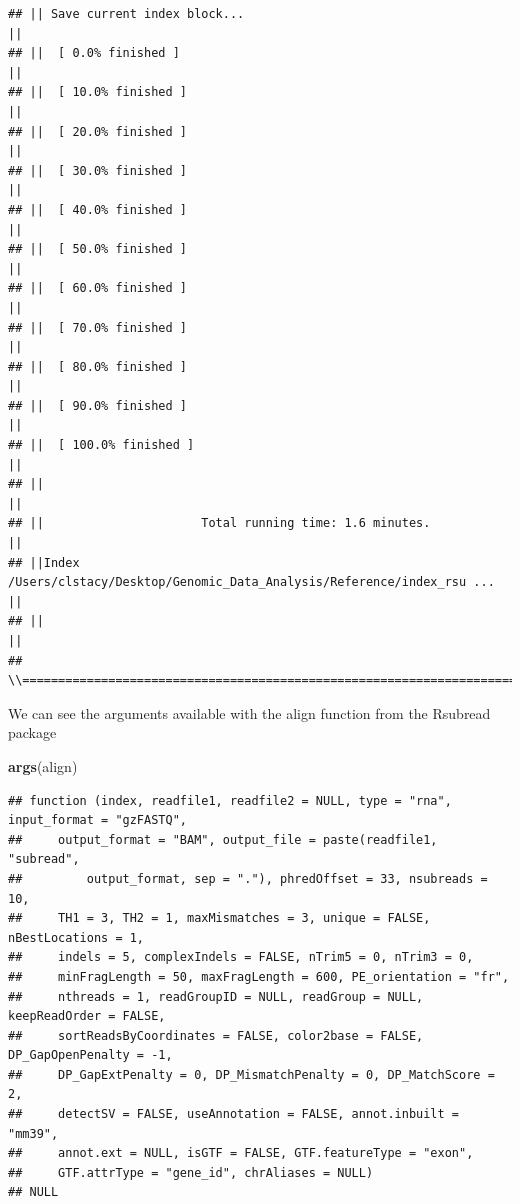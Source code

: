 \documentclass[
]{book}
\newenvironment{Shaded}{\begin{snugshade}}{\end{snugshade}}
\newcommand{\FunctionTok}[1]{\textcolor[rgb]{0.13,0.29,0.53}{\textbf{#1}}}
\newcommand{\NormalTok}[1]{#1}
\begin{document}
\begin{verbatim}
## || Save current index block...                                                ||
## ||  [ 0.0% finished ]                                                         ||
## ||  [ 10.0% finished ]                                                        ||
## ||  [ 20.0% finished ]                                                        ||
## ||  [ 30.0% finished ]                                                        ||
## ||  [ 40.0% finished ]                                                        ||
## ||  [ 50.0% finished ]                                                        ||
## ||  [ 60.0% finished ]                                                        ||
## ||  [ 70.0% finished ]                                                        ||
## ||  [ 80.0% finished ]                                                        ||
## ||  [ 90.0% finished ]                                                        ||
## ||  [ 100.0% finished ]                                                       ||
## ||                                                                            ||
## ||                      Total running time: 1.6 minutes.                      ||
## ||Index /Users/clstacy/Desktop/Genomic_Data_Analysis/Reference/index_rsu ... ||
## ||                                                                            ||
## \\============================================================================//
\end{verbatim}

We can see the arguments available with the align function from the Rsubread package

\begin{Shaded}
\begin{Highlighting}[]
\FunctionTok{args}\NormalTok{(align)}
\end{Highlighting}
\end{Shaded}

\begin{verbatim}
## function (index, readfile1, readfile2 = NULL, type = "rna", input_format = "gzFASTQ", 
##     output_format = "BAM", output_file = paste(readfile1, "subread", 
##         output_format, sep = "."), phredOffset = 33, nsubreads = 10, 
##     TH1 = 3, TH2 = 1, maxMismatches = 3, unique = FALSE, nBestLocations = 1, 
##     indels = 5, complexIndels = FALSE, nTrim5 = 0, nTrim3 = 0, 
##     minFragLength = 50, maxFragLength = 600, PE_orientation = "fr", 
##     nthreads = 1, readGroupID = NULL, readGroup = NULL, keepReadOrder = FALSE, 
##     sortReadsByCoordinates = FALSE, color2base = FALSE, DP_GapOpenPenalty = -1, 
##     DP_GapExtPenalty = 0, DP_MismatchPenalty = 0, DP_MatchScore = 2, 
##     detectSV = FALSE, useAnnotation = FALSE, annot.inbuilt = "mm39", 
##     annot.ext = NULL, isGTF = FALSE, GTF.featureType = "exon", 
##     GTF.attrType = "gene_id", chrAliases = NULL) 
## NULL
\end{verbatim}
\end{document}
